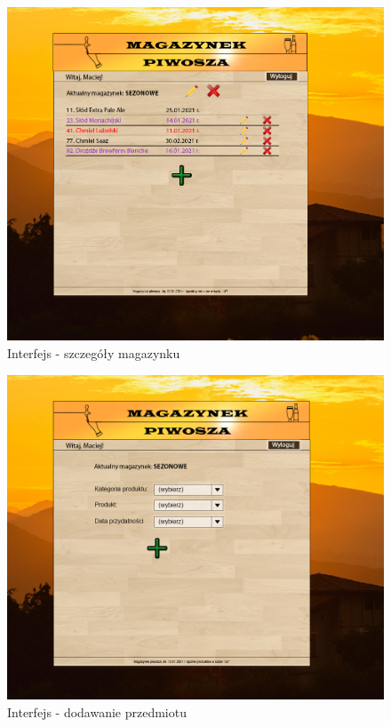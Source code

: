 \documentclass[12pt,a4paper]{article}
\begin{document}
		\begin{figure}[H]
			\centering
			\includegraphics[width=\textwidth]{img/interfejs3.png}
			\caption{Interfejs - szczegóły magazynku}
			\label{fig:int-mag-szcz}
		\end{figure}
		\begin{figure}[H]
			\centering
			\includegraphics[width=\textwidth]{img/interfejs4.png}
			\caption{Interfejs - dodawanie przedmiotu}
			\label{fig:int-add-item}
		\end{figure}
	\newpage
	
\end{document}
